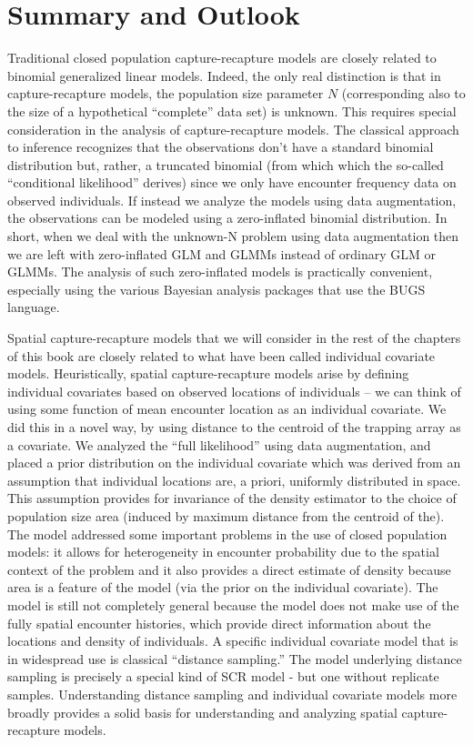 \section{Summary and Outlook}

Traditional closed population capture-recapture models are closely related to binomial generalized linear models.  Indeed, the only real distinction is that in capture-recapture models, the population size parameter $N$ (corresponding also to the size of a hypothetical ``complete'' data set) is unknown.  This requires special consideration in the analysis of capture-recapture models. The classical approach to inference recognizes that the observations don't have a standard binomial distribution but, rather, a truncated binomial (from which which the so-called ``conditional likelihood'' derives) since we only have encounter frequency data on observed individuals. If instead we analyze the models using data augmentation, the observations can be modeled using a zero-inflated binomial distribution. In short, when we deal with the unknown-N problem using data augmentation then we are left with zero-inflated GLM and GLMMs instead of ordinary GLM or GLMMs. The analysis of such zero-inflated models is practically convenient, especially using the various Bayesian analysis packages that use the BUGS language.

Spatial capture-recapture models that we will consider in the rest of the chapters of this book are closely related to what have been called individual covariate models. Heuristically, spatial capture-recapture models arise by defining individual covariates based on observed locations of individuals -- we can think of using some function of mean encounter location as an individual covariate. We did this in a novel way, by using distance to the centroid of the trapping array as a covariate. We analyzed the ``full likelihood'' using data augmentation, and placed a prior distribution on the individual covariate which was derived from an assumption that individual locations are, a priori, uniformly distributed in space. This assumption provides for invariance of the density estimator to the choice of population size area (induced by maximum distance from the centroid of the). The model addressed some important problems in the use of closed population models: it allows for heterogeneity in encounter probability due to the spatial context of the problem and it also provides a direct estimate of density because area is a feature of the model (via the prior on the individual covariate). The model is still not completely general because the model does not make use of the fully spatial encounter histories, which provide direct information about the locations and density of individuals.
A specific individual covariate model that is in widespread use is
classical ``distance sampling.'' The model underlying distance sampling is precisely a special kind of SCR model - but one without replicate samples. Understanding distance sampling and individual covariate models more broadly provides a solid basis for understanding and analyzing spatial capture-recapture models.

